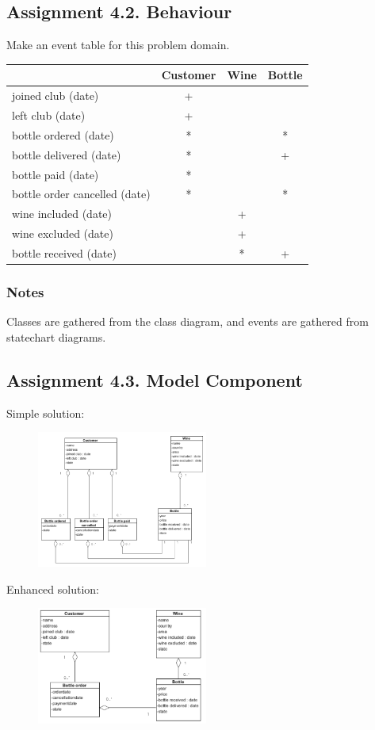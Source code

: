 \subsection{Assignment 4.2. Behaviour}
Make an event table for this problem domain.
\begin{center}
    \begin{tabular}{|l|c|c|c|}
    \hline
         & Customer & Wine & Bottle \\ \hline
        joined club (date) & + & & \\ \hline
        left club (date) & + & & \\ \hline
        bottle ordered (date) & * & & * \\ \hline
        bottle delivered (date) & * & & + \\ \hline
        bottle paid (date) & * & & \\ \hline
        bottle order cancelled (date) & * & & * \\ \hline
        wine included (date) & & + & \\ \hline
        wine excluded (date) & & + & \\ \hline
        bottle received (date) & & * & + \\ \hline
    \end{tabular}
\end{center}
\subsubsection*{Notes}
Classes are gathered from the class diagram, and events are gathered from statechart diagrams.
\subsection{Assignment 4.3. Model Component}
Simple solution:
\begin{figure}[H]
    \centering
    \includegraphics[width=0.5\textwidth]{figures/assignment4-3modelcomponent2018-1.png}
\end{figure}
\noindent Enhanced solution:
\begin{figure}[H]
    \centering
    \includegraphics[width=0.5\textwidth]{figures/assignment4-3modelcomponent2018-2.png}
\end{figure}

